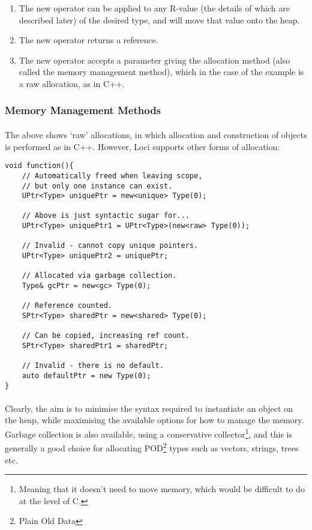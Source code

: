 \documentclass[12pt,twoside,notitlepage]{report}
\begin{document}
\begin{enumerate}
\item The new operator can be applied to any R-value (the details of which are described later) of the desired type, and will move that value onto the heap.
\item The new operator returns a reference.
\item The new operator accepts a parameter giving the allocation method (also called the memory management method), which in the case of the example is a raw allocation, as in C++.
\end{enumerate}

\subsubsection{Memory Management Methods}

\paragraph{}
The above shows `raw' allocations, in which allocation and construction of objects is performed as in C++. However, Loci supports other forms of allocation:

\small{
\begin{verbatim}
void function(){
    // Automatically freed when leaving scope,
    // but only one instance can exist.
    UPtr<Type> uniquePtr = new<unique> Type(0);
    
    // Above is just syntactic sugar for...
    UPtr<Type> uniquePtr1 = UPtr<Type>(new<raw> Type(0));
    
    // Invalid - cannot copy unique pointers.
    UPtr<Type> uniquePtr2 = uniquePtr;
    
    // Allocated via garbage collection.
    Type& gcPtr = new<gc> Type(0);
    
    // Reference counted.
    SPtr<Type> sharedPtr = new<shared> Type(0);
    
    // Can be copied, increasing ref count.
    SPtr<Type> sharedPtr1 = sharedPtr;
    
    // Invalid - there is no default.
    auto defaultPtr = new Type(0);
}
\end{verbatim}
}

\paragraph{}
Clearly, the aim is to minimise the syntax required to instantiate an object on the heap, while maximising the available options for how to manage the memory. Garbage collection is also available, using a conservative collector\footnote{Meaning that it doesn't need to move memory, which would be difficult to do at the level of C.}, and this is generally a good choice for allocating POD\footnote{Plain Old Data} types such as vectors, strings, trees etc.
\end{document}
